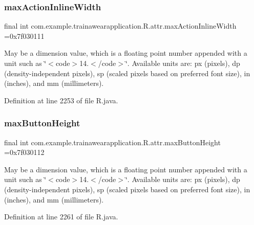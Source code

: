 \subsubsection{\texorpdfstring{maxActionInlineWidth}{maxActionInlineWidth}}
{\footnotesize\ttfamily final int com.\+example.\+trainawearapplication.\+R.\+attr.\+max\+Action\+Inline\+Width =0x7f030111\hspace{0.3cm}{\ttfamily [static]}}

May be a dimension value, which is a floating point number appended with a unit such as \char`\"{}$<$code$>$14.\+5sp$<$/code$>$\char`\"{}. Available units are\+: px (pixels), dp (density-\/independent pixels), sp (scaled pixels based on preferred font size), in (inches), and mm (millimeters). 

Definition at line 2253 of file R.\+java.

\mbox{\label{classcom_1_1example_1_1trainawearapplication_1_1_r_1_1attr_a4c5e02e478aa92c377c59300cb3fe42e}} 
\subsubsection{\texorpdfstring{maxButtonHeight}{maxButtonHeight}}
{\footnotesize\ttfamily final int com.\+example.\+trainawearapplication.\+R.\+attr.\+max\+Button\+Height =0x7f030112\hspace{0.3cm}{\ttfamily [static]}}

May be a dimension value, which is a floating point number appended with a unit such as \char`\"{}$<$code$>$14.\+5sp$<$/code$>$\char`\"{}. Available units are\+: px (pixels), dp (density-\/independent pixels), sp (scaled pixels based on preferred font size), in (inches), and mm (millimeters). 

Definition at line 2261 of file R.\+java.

\mbox{\label{classcom_1_1example_1_1trainawearapplication_1_1_r_1_1attr_a7c9cba83ce87d751598db498dbab69b2}} 

